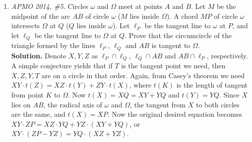 \documentclass[11pt,a4paper]{article}
\begin{document}
\begin{enumerate}
\item\emph {APMO 2014, \#5.} Circles $\omega$ and $\Omega$ meet at points $A$ and $B$. Let $M$ be the midpoint of the arc $AB$ of circle $\omega$ ($M$ lies inside $\Omega$). A chord $MP$ of circle $\omega$ intersects $\Omega$ at $Q$ ($Q$ lies inside $\omega$). Let $\ell_P$ be the tangent line to $\omega$ at $P$, and let $\ell_Q$ be the tangent line to $\Omega$ at $Q$. Prove that the circumcircle of the triangle formed by the lines $\ell_P$, $\ell_Q$ and $AB$ is tangent to $\Omega$.\\
\textbf {Solution.} Denote $X, Y, Z$ as $\ell_P\cap\ell_Q$, $\ell_Q\cap AB$ and $AB\cap\ell_P$, respectively. A simple conjecture yields that if $T$ is the tangent point we need, then $X,Z,Y,T$ are on a circle in that order. Again, from Casey's theorem we need $XY\cdot t(Z)=XZ\cdot t(Y)+ZY\cdot t(X)$, where $t(K)$ is the length of tangent from point $K$ to $\Omega$. Now $t(X)=XQ=XY+YQ$ and $t(Y)=YQ$. Since $X$ lies on $AB$, the radical axis of $\omega$ and $\Omega$, the tangent from $X$ to both circles are the same, and $t(X)=XP$. Now the original desired equation becomes $XY\cdot ZP=XZ\cdot YQ+YZ\cdot (XY+YQ)$, or $XY\cdot (ZP-YZ)=YQ\cdot (XZ+YZ)$.


\usetikzlibrary{arrows}


\end{enumerate}
\end{document}
